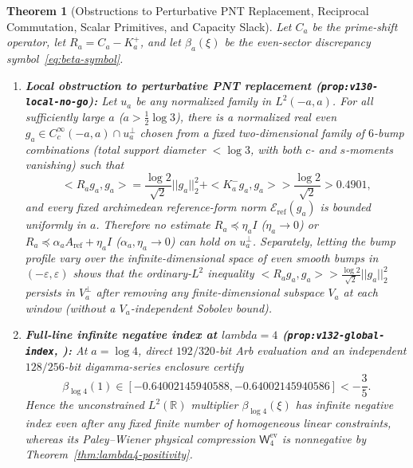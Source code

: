 \documentclass[11pt]{article}
\def\lambda{lambda}%
\def\norm#1{||#1||}%
\def\ip#1#2{<#1,#2>}%
\newtheorem{theorem}{Theorem}[section]
\theoremstyle{remark}
\newcommand{\norm}[1]{\left\lVert #1\right\rVert}
\newcommand{\ip}[2]{\left\langle #1,#2\right\rangle}
\begin{document}
\begin{theorem}[Obstructions to Perturbative PNT Replacement, Reciprocal Commutation, Scalar Primitives, and Capacity Slack]
\label{thm:concentration-obstructions}
Let $C_a$ be the prime-shift operator, let $R_a = C_a - K_a^+$, and let $\beta_a(\xi)$ be the even-sector discrepancy symbol~\eqref{eq:beta-symbol}.
\begin{enumerate}[label=(\alph*)]
  \item \textbf{Local obstruction to perturbative PNT replacement (\texttt{prop:v130-local-no-go}):} Let $u_a$ be any normalized family in $L^2(-a,a)$. For all sufficiently large $a$ ($a > \tfrac{1}{2}\log 3$), there is a normalized real even $g_a \in C_c^\infty(-a,a) \cap u_a^\perp$ chosen from a \emph{fixed two-dimensional family} of $6$-bump combinations (total support diameter $< \log 3$, with both $c$- and $s$-moments vanishing) such that
  \begin{equation}\label{eq:v130-local-no-go}
    \ip{R_a g_a}{g_a} = \frac{\log 2}{\sqrt{2}}\norm{g_a}_2^2 + \ip{K_a^- g_a}{g_a} > \frac{\log 2}{\sqrt{2}} > 0.4901,
  \end{equation}
  and every fixed archimedean reference-form norm $\mathcal{E}_{\mathrm{ref}}(g_a)$ is bounded uniformly in $a$. Therefore no estimate $R_a \preceq \eta_a I$ ($\eta_a \to 0$) or $R_a \preceq \alpha_a A_{\mathrm{ref}} + \eta_a I$ ($\alpha_a, \eta_a \to 0$) can hold on $u_a^\perp$. Separately, letting the bump profile vary over the infinite-dimensional space of even smooth bumps in $(-\varepsilon, \varepsilon)$ shows that the ordinary-$L^2$ inequality $\ip{R_a g_a}{g_a} > \frac{\log 2}{\sqrt{2}}\norm{g_a}_2^2$ persists in $V_a^\perp$ after removing any finite-dimensional subspace $V_a$ at each window (without a $V_a$-independent Sobolev bound).
  \item \textbf{Full-line infinite negative index at $\lambda = 4$ (\texttt{prop:v132-global-index}, ):} At $a = \log 4$, direct $192/320$-bit Arb evaluation and an independent $128/256$-bit digamma-series enclosure certify
  \begin{equation}
    \beta_{\log 4}(1) \in [-0.64002145940588, -0.64002145940586] < -\frac{3}{5}.
  \end{equation}
  Hence the unconstrained $L^2(\mathbb{R})$ multiplier $\beta_{\log 4}(\xi)$ has infinite negative index even after any fixed finite number of homogeneous linear constraints, whereas its Paley--Wiener physical compression $\mathsf{W}_4^{\mathrm{ev}}$ is nonnegative by Theorem~\ref{thm:lambda4-positivity}.

\end{enumerate}
\end{theorem}
\end{document}
